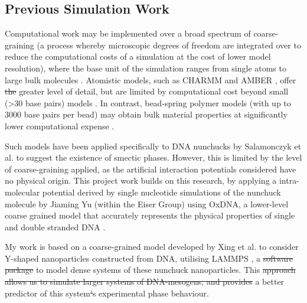 \documentclass[11pt, a4paper]{article} %
\providecommand{\DIFadd}[1]{{\protect\color{blue}\uwave{#1}}} %
\providecommand{\DIFdel}[1]{{\protect\color{red}\sout{#1}}}                      %
\providecommand{\DIFaddbegin}{} %
\providecommand{\DIFaddend}{} %
\providecommand{\DIFdelbegin}{} %
\providecommand{\DIFdelend}{} %
\begin{document}

\subsection{Previous Simulation Work} \label{sec:PrevWork}
Computational work may be implemented over a broad spectrum of coarse-graining (a process whereby microscopic degrees of freedom are integrated over to reduce the computational costs of a simulation at the cost of lower model resolution), where the base unit of the simulation ranges from single atoms to large bulk molecules \cite{Inglfsson2013, Potoyan2012}. Atomistic models, such as CHARMM \cite{MacKerell1995} and AMBER \cite{SalomonFerrer2012}, offer \DIFdelbegin \DIFdel{the }\DIFdelend \DIFaddbegin \DIFadd{a }\DIFaddend greater level of detail, but are limited by computational cost beyond small (>30 base pairs) models \cite{Cheatham2004}. In contrast, bead-spring polymer models (with up to 3000 base pairs per bead) may obtain bulk material properties at significantly lower computational expense \cite{Michieletto2016}.

Such models have been applied specifically to DNA nunchucks by Salamonczyk et al. \cite{Salamonczyk2016} to suggest the existence of smectic phases. However, this is limited by the level of coarse-graining applied, as the artificial interaction potentials considered have no physical origin. This project work builds on this research, by applying a intra-molecular potential derived by single nucleotide simulations of the nunchuck molecule by Jiaming Yu (within the Eiser Group) using OxDNA, a lower-level coarse grained model that accurately represents the physical properties of single and double stranded DNA \cite{OxDNA}.

My work is based on a coarse-grained model developed by Xing et al. \cite{Xing2019} to consider Y-shaped nanoparticles constructed from DNA, utilising LAMMPS \cite{LAMMPS}, a \DIFdelbegin \DIFdel{software package }\DIFdelend \DIFaddbegin \DIFadd{software-package }\DIFaddend to model dense systems of these nunchuck nanoparticles. This \DIFdelbegin \DIFdel{approach allows us to simulate larger systems of DNA-mesogens, and provides }\DIFdelend \DIFaddbegin \DIFadd{\textcolor{forestgreen}{approach allows us to simulate larger systems of DNA-mesogens, and provides} }\DIFaddend a better predictor of this system\DIFdelbegin \DIFdel{’}\DIFdelend \DIFaddbegin \DIFadd{'}\DIFaddend s experimental phase behaviour.
\end{document}
